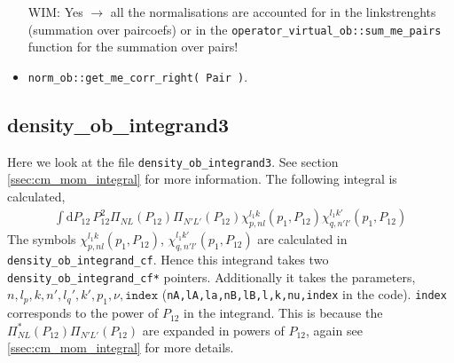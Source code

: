 \documentclass[10pt]{article}
\begin{document}
\begin{itemize}
{	WIM: Yes $\rightarrow$ all the normalisations are accounted for in the 
linkstrenghts (summation over paircoefs) or in the 
\texttt{operator\_virtual\_ob::sum\_me\_pairs} function for the summation over 
pairs!
		}
	\item \texttt{norm\_ob::get\_me\_corr\_right( Pair )}.
\end{itemize}

\subsection{ density\_ob\_integrand3 }
Here we look at the file \texttt{density\_ob\_integrand3}. See section 
\ref{ssec:cm_mom_integral} for more information. The following integral is 
calculated,
\begin{align*}
\int \text{d} P_{12} \, P_{12}^{2} \Pi_{N L}(P_{12}) \Pi_{N' L'}(P_{12}) 
\chi_{p,nl}^{l_1 k}(p_1,P_{12}) \chi_{q,n'l'}^{l_1 k'}(p_1,P_{12}) 
\end{align*}
The symbols $\chi_{p,nl}^{l_1 k}(p_1,P_{12})$, $\chi_{q,n'l'}^{l_1 
k'}(p_1,P_{12})$ are calculated in \texttt{density\_ob\_integrand\_cf}. Hence 
this integrand takes two \texttt{density\_ob\_integrand\_cf*} pointers. 
Additionally it takes the parameters, 
$n,l_p,k,n',l_q',k',p_1,\nu,\texttt{index}$ 
(\texttt{nA,lA,la,nB,lB,l,k,nu,index} in the code). \texttt{index} corresponds 
to the power of $P_{12}$ in the integrand. This is because the $\Pi^{*}_{N 
L}(P_{12}) \Pi_{N' L'}(P_{12})$ are expanded in powers of $P_{12}$, again see 
\ref{ssec:cm_mom_integral} for more details.
\end{document}
